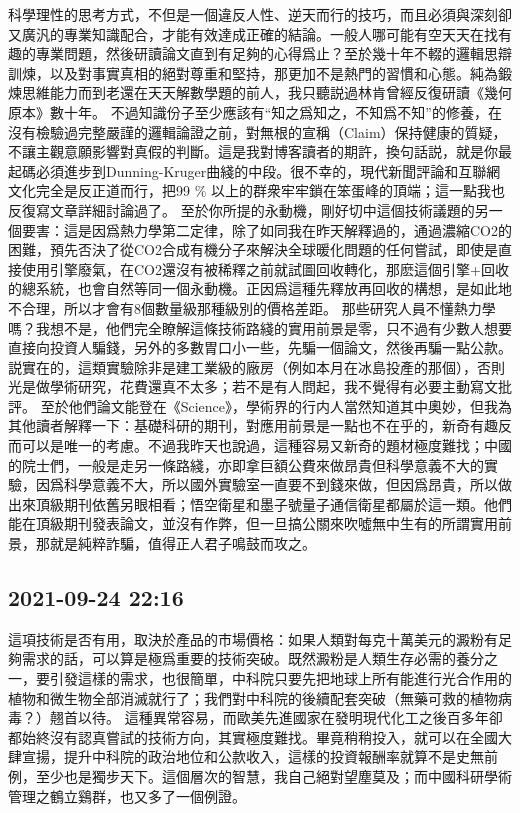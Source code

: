 \documentclass[twocolumn]{ctexart}
\begin{document}
科學理性的思考方式，不但是一個違反人性、逆天而行的技巧，而且必須與深刻卻又廣汎的專業知識配合，才能有效達成正確的結論。一般人哪可能有空天天在找有趣的專業問題，然後研讀論文直到有足夠的心得爲止？至於幾十年不輟的邏輯思辯訓煉，以及對事實真相的絕對尊重和堅持，那更加不是熱門的習慣和心態。純為鍛煉思維能力而到老還在天天解數學題的前人，我只聽説過林肯曾經反復研讀《幾何原本》數十年。
不過知識份子至少應該有“知之爲知之，不知爲不知”的修養，在沒有檢驗過完整嚴謹的邏輯論證之前，對無根的宣稱（Claim）保持健康的質疑，不讓主觀意願影響對真假的判斷。這是我對博客讀者的期許，換句話説，就是你最起碼必須進步到Dunning-Kruger曲綫的中段。很不幸的，現代新聞評論和互聯網文化完全是反正道而行，把99 \% 以上的群衆牢牢鎖在笨蛋峰的頂端；這一點我也反復寫文章詳細討論過了。
至於你所提的永動機，剛好切中這個技術議題的另一個要害：這是因爲熱力學第二定律，除了如同我在昨天解釋過的，通過濃縮CO2的困難，預先否決了從CO2合成有機分子來解決全球暖化問題的任何嘗試，即使是直接使用引擎廢氣，在CO2還沒有被稀釋之前就試圖回收轉化，那麽這個引擎+回收的總系統，也會自然等同一個永動機。正因爲這種先釋放再回收的構想，是如此地不合理，所以才會有8個數量級那種級別的價格差距。
那些研究人員不懂熱力學嗎？我想不是，他們完全瞭解這條技術路綫的實用前景是零，只不過有少數人想要直接向投資人騙錢，另外的多數胃口小一些，先騙一個論文，然後再騙一點公款。説實在的，這類實驗除非是建工業級的廠房（例如本月在冰島投產的那個），否則光是做學術研究，花費還真不太多；若不是有人問起，我不覺得有必要主動寫文批評。
至於他們論文能登在《Science》，學術界的行内人當然知道其中奧妙，但我為其他讀者解釋一下：基礎科研的期刊，對應用前景是一點也不在乎的，新奇有趣反而可以是唯一的考慮。不過我昨天也說過，這種容易又新奇的題材極度難找；中國的院士們，一般是走另一條路綫，亦即拿巨額公費來做昂貴但科學意義不大的實驗，因爲科學意義不大，所以國外實驗室一直要不到錢來做，但因爲昂貴，所以做出來頂級期刊依舊另眼相看；悟空衛星和墨子號量子通信衛星都屬於這一類。他們能在頂級期刊發表論文，並沒有作弊，但一旦搞公關來吹噓無中生有的所謂實用前景，那就是純粹詐騙，值得正人君子鳴鼓而攻之。
\subsection*{2021-09-24 22:16}

這項技術是否有用，取決於產品的市場價格：如果人類對每克十萬美元的澱粉有足夠需求的話，可以算是極爲重要的技術突破。既然澱粉是人類生存必需的養分之一，要引發這樣的需求，也很簡單，中科院只要先把地球上所有能進行光合作用的植物和微生物全部消滅就行了；我們對中科院的後續配套突破（無藥可救的植物病毒？）翹首以待。
這種異常容易，而歐美先進國家在發明現代化工之後百多年卻都始終沒有認真嘗試的技術方向，其實極度難找。畢竟稍稍投入，就可以在全國大肆宣揚，提升中科院的政治地位和公款收入，這樣的投資報酬率就算不是史無前例，至少也是獨步天下。這個層次的智慧，我自己絕對望塵莫及；而中國科研學術管理之鶴立鷄群，也又多了一個例證。
\end{document}
